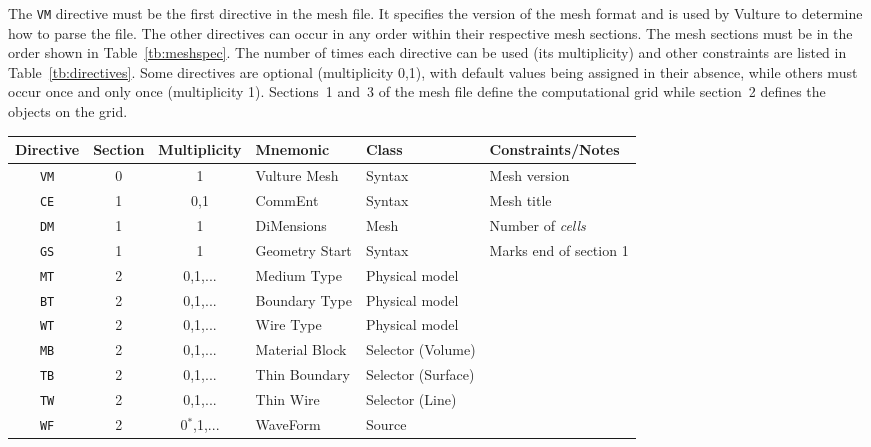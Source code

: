 \documentclass[onecolumn,a4paper]{article}
\numberwithin{equation}{section}
\begin{document}
The \texttt{VM} directive must be the first directive in the mesh file. It specifies the version of
the mesh format and is used by Vulture to determine how to parse the file. The other directives
can occur in any order within their respective mesh sections. The mesh sections must be in the order
shown in Table~\ref{tb:meshspec}. The number of times each directive can be used (its multiplicity)
and other constraints are listed in Table~\ref{tb:directives}. Some directives are optional (multiplicity 0,1), 
with default values being assigned in their absence, while others must occur once and only once (multiplicity 1). 
Sections~1 and~3 of the mesh file define the computational grid while section~2 defines the objects on the grid.

\begin{table}[ht]
\begin{center}
{\small
\begin{tabular}{|c|c|c|l|l|l|}\hline
Directive   &Section &Multiplicity &Mnemonic             &Class              &Constraints/Notes      \\  \hline
\texttt{VM} &0       &1            &Vulture Mesh         &Syntax             &Mesh version           \\
\texttt{CE} &1       &0,1          &CommEnt              &Syntax             &Mesh title             \\  
\texttt{DM} &1       &1            &DiMensions           &Mesh               &Number of {\em cells}  \\ 
\texttt{GS} &1       &1            &Geometry Start       &Syntax             &Marks end of section 1 \\ 
\texttt{MT} &2       &0,1,...      &Medium Type          &Physical model     &                       \\ 
\texttt{BT} &2       &0,1,...      &Boundary Type        &Physical model     &                       \\ 
\texttt{WT} &2       &0,1,...      &Wire Type            &Physical model     &                       \\ 
\texttt{MB} &2       &0,1,...      &Material Block       &Selector (Volume)  &                       \\ 
\texttt{TB} &2       &0,1,...      &Thin Boundary        &Selector (Surface) &                       \\ 
\texttt{TW} &2       &0,1,...      &Thin Wire            &Selector (Line)    &                       \\ 
\texttt{WF} &2       &0$^*$,1,...  &WaveForm             &Source             &                       \\ 

\end{tabular}}
\end{center}
\end{table}
\end{document}
